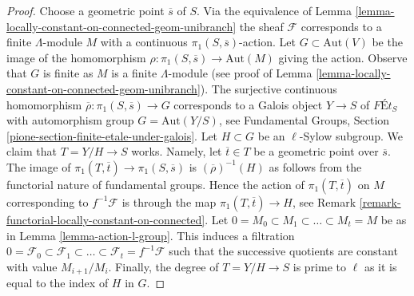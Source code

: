 \documentclass[10pt,a4paper]{amsart}
\theoremstyle{plain}
\theoremstyle{definition}
\theoremstyle{remark}
\numberwithin{equation}{subsection}
\begin{document}
\begin{proof}
Choose a geometric point $\overline{s}$ of $S$.
Via the equivalence of
Lemma \ref{lemma-locally-constant-on-connected-geom-unibranch}
the sheaf $\mathcal{F}$ corresponds to a finite $\Lambda$-module
$M$ with a continuous $\pi_1(S, \overline{s})$-action.
Let $G \subset \text{Aut}(V)$ be the image of the homomorphism
$\rho : \pi_1(S, \overline{s}) \to \text{Aut}(M)$ giving the action.
Observe that $G$ is finite as $M$ is a finite $\Lambda$-module
(see proof of Lemma \ref{lemma-locally-constant-on-connected-geom-unibranch}).
The surjective continuous homomorphism
$\overline{\rho} : \pi_1(S, \overline{s}) \to G$
corresponds to a Galois object $Y \to S$ of
$\textit{F\'Et}_S$ with automorphism group $G = \text{Aut}(Y/S)$, see
Fundamental Groups, Section \ref{pione-section-finite-etale-under-galois}.
Let $H \subset G$ be an $\ell$-Sylow subgroup.
We claim that $T = Y/H \to S$ works. Namely, let $\overline{t} \in T$
be a geometric point over $\overline{s}$. The image of
$\pi_1(T, \overline{t}) \to \pi_1(S, \overline{s})$
is $(\overline{\rho})^{-1}(H)$ as follows from the functorial
nature of fundamental groups. Hence the action of $\pi_1(T, \overline{t})$
on $M$ corresponding to $f^{-1}\mathcal{F}$ is through
the map $\pi_1(T, \overline{t}) \to H$, see
Remark \ref{remark-functorial-locally-constant-on-connected}.
Let $0 = M_0 \subset M_1 \subset \ldots \subset M_t = M$
be as in Lemma \ref{lemma-action-l-group}.
This induces a filtration
$0 = \mathcal{F}_0 \subset \mathcal{F}_1 \subset \ldots
\subset \mathcal{F}_t = f^{-1}\mathcal{F}$
such that the successive quotients are constant with
value $M_{i + 1}/M_i$.
Finally, the degree of $T = Y/H \to S$ is prime to $\ell$
as it is equal to the index of $H$ in $G$.
\end{proof}
\end{document}
